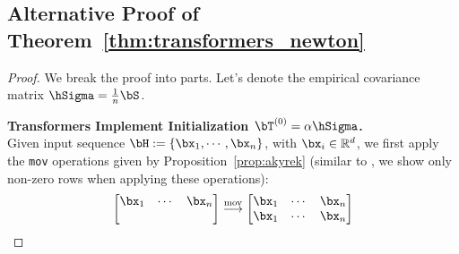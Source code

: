 \subsection{Alternative Proof of Theorem~\ref{thm:transformers_newton}}
\TransformersNewton*
\begin{proof} We break the proof into parts. Let's denote the empirical covariance matrix $\hSigma = \frac{1}{n} \bS$. 

\textbf{Transformers Implement Initialization $\bT^{(0)}  = \alpha \hSigma$.} \\
Given input sequence $\bH := \{\bx_1, \cdots, \bx_n\}$, with $\bx_i \in \mathbb R^d$,  we first apply the \verb|mov| operations given by Proposition~\ref{prop:akyrek} (similar to \cite{Akyrek2022WhatLA}, we show only non-zero rows when applying these operations):
\begin{equation}
    \begin{bmatrix}
        \bx_1 & \cdots & \bx_n \\
        & & 
    \end{bmatrix} \overset{\mathrm{mov}}{\longrightarrow} \begin{bmatrix}
        \bx_1 & \cdots & \bx_n  \\
        \bx_1 & \cdots & \bx_n 
    \end{bmatrix}
\end{equation}




\end{proof}

